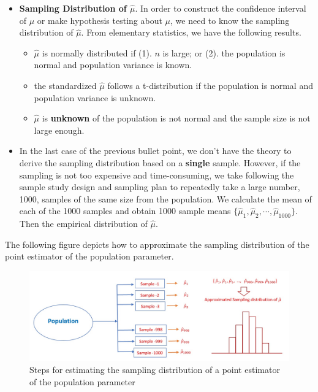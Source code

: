 \documentclass[
]{book}
\begin{document}
\begin{itemize}
\item
  \textbf{Sampling Distribution of \(\hat{\mu}\)}. In order to construct the confidence interval of \(\mu\) or make hypothesis testing about \(\mu\), we need to know the sampling distribution of \(\hat{\mu}\). From elementary statistics, we have the following results.

  \begin{itemize}
  \item
    \(\hat{\mu}\) is normally distributed if (1). \(n\) is large; or (2). the population is normal and population variance is known.
  \item
    the standardized \(\hat{\mu}\) follows a t-distribution if the population is normal and population variance is unknown.
  \item
    \(\hat{\mu}\) is \textbf{unknown} of the population is not normal and the sample size is not large enough.
  \end{itemize}
\item
  In the last case of the previous bullet point, we don't have the theory to derive the sampling distribution based on a \textbf{single} sample. However, if the sampling is not too expensive and time-consuming, we take following the sample study design and sampling plan to repeatedly take a large number, 1000, samples of the same size from the population. We calculate the mean of each of the 1000 samples and obtain 1000 sample means \(\{\hat{\mu}_1, \hat{\mu}_2, \cdots, \hat{\mu}_{1000}\}\). Then the empirical distribution of \(\hat{\mu}\).
\end{itemize}

The following figure depicts how to approximate the sampling distribution of the point estimator of the population parameter.

\begin{figure}

{\centering \includegraphics[width=0.95\linewidth]{img02/w02-ApproxSamplingDist} 

}

\caption{Steps for estimating the sampling distribution of a point estimator of the population parameter}\label{fig:unnamed-chunk-52}
\end{figure}
\end{document}
